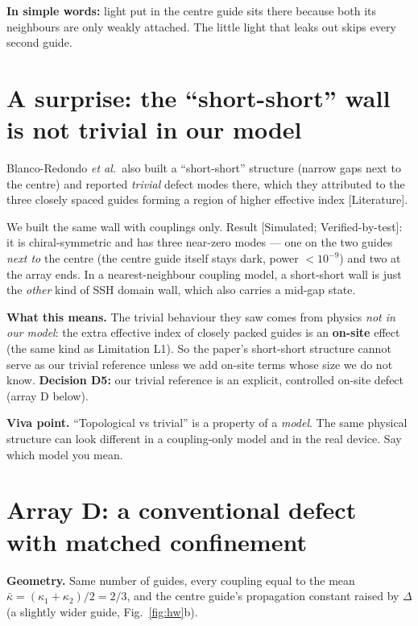 \documentclass[10pt,a4paper]{article}
\newcommand{\ka}{\kappa_1}
\newcommand{\kc}{\kappa_2}
\newcommand{\kb}{\bar\kappa}
\newcommand{\note}[1]{\par\smallskip\noindent\colorbox{gray!12}{\parbox{\dimexpr\linewidth-2\fboxsep}{\small #1}}\par\smallskip}
\newcommand{\evd}[1]{\textsf{\small[#1]}}
\newcommand{\simple}[1]{\par\noindent\textbf{In simple words:} #1\par\smallskip}
\begin{document}
\simple{light put in the centre guide sits there because both its neighbours are only weakly attached. The little light that leaks out skips every second guide.}

\section{A surprise: the ``short-short'' wall is not trivial in our model}
Blanco-Redondo \emph{et al.}\ also built a ``short-short'' structure (narrow gaps next to the centre) and reported \emph{trivial} defect modes there, which they attributed to the three closely spaced guides forming a region of higher effective index \evd{Literature}.

We built the same wall with couplings only. Result \evd{Simulated; Verified-by-test}: it is chiral-symmetric and has three near-zero modes --- one on the two guides \emph{next to} the centre (the centre guide itself stays dark, power $<10^{-9}$) and two at the array ends. In a nearest-neighbour coupling model, a short-short wall is just the \emph{other} kind of SSH domain wall, which also carries a mid-gap state.

\textbf{What this means.} The trivial behaviour they saw comes from physics \emph{not in our model}: the extra effective index of closely packed guides is an \textbf{on-site} effect (the same kind as Limitation L1). So the paper's short-short structure cannot serve as our trivial reference unless we add on-site terms whose size we do not know. \textbf{Decision D5:} our trivial reference is an explicit, controlled on-site defect (array D below).

\note{\textbf{Viva point.} ``Topological vs trivial'' is a property of a \emph{model}. The same physical structure can look different in a coupling-only model and in the real device. Say which model you mean.}

\section{Array D: a conventional defect with matched confinement}
\textbf{Geometry.} Same number of guides, every coupling equal to the mean $\kb=(\ka+\kc)/2=2/3$, and the centre guide's propagation constant raised by $\Delta$ (a slightly wider guide, Fig.~\ref{fig:hw}b).
\end{document}
